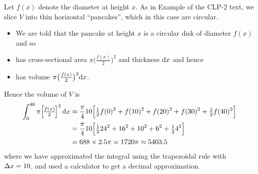 \begin{solution}
Let $f(x)$ denote the diameter at height $x$.
As in Example  of the
CLP-2 text, we slice $V$  into thin horizontal ``pancakes'', which in
this case are circular.

\begin{center}
\end{center}

\begin{itemize}
\item We are told that the pancake at height $x$ is a circular disk
of diameter $f(x)$ and so
\item has cross-sectional area $\pi\big(\frac{f(x)}{2}\big)^2$ and
thickness $\mathrm{d}x$ and hence
\item has volume $\pi\big(\frac{f(x)}{2}\big)^2\mathrm{d}x$.
\end{itemize}


\noindent Hence the volume of $V$ is
\begin{align*}
\int_0^{40}\pi\Big{[\frac{f(x)}{2}\Big]}^2\,\mathrm{d}x
&\approx \frac{\pi}{4}10\Big[\tfrac{1}{2} f(0)^2+f(10)^2+f(20)^2+f(30)^2+\tfrac{1}{2}
f(40)^2\Big]\\
&=\frac{\pi}{4}10\Big[\tfrac{1}{2} 24^2+16^2+10^2+6^2+\tfrac{1}{2} 4^2\Big]\\
&=688\times 2.5\pi
=1720\pi\approx 5403.5
\end{align*}
where we have approximated the integral using the trapezoidal rule with $\Delta
x=10$, and used a calculator to get a decimal approximation.


\end{solution}
